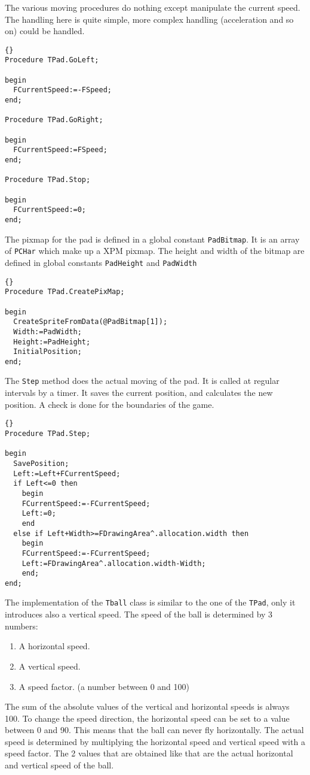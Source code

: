 \documentclass[10pt]{article}
\newcommand{\var}[1]{\texttt{#1}}
\begin{document}
The various moving procedures do nothing except manipulate the current speed.
The handling here is quite simple, more complex handling (acceleration and
so on) could be handled.
\begin{lstlisting}{}
Procedure TPad.GoLeft;

begin
  FCurrentSpeed:=-FSpeed;
end;

Procedure TPad.GoRight;

begin
  FCurrentSpeed:=FSpeed;
end;

Procedure TPad.Stop;

begin
  FCurrentSpeed:=0;
end;
\end{lstlisting}{}
The pixmap for the pad is defined in a global constant \var{PadBitmap}. It is 
an array of \var{PCHar} which make up a XPM pixmap. The height and width of 
the bitmap are defined in global constants \var{PadHeight} and \var{PadWidth}
\begin{lstlisting}{}
Procedure TPad.CreatePixMap; 

begin
  CreateSpriteFromData(@PadBitmap[1]);
  Width:=PadWidth;
  Height:=PadHeight;
  InitialPosition;
end;
\end{lstlisting}{}
The \var{Step} method does the actual moving of the pad. It is called at regular intervals
by a timer. It saves the current position, and calculates the new position. A check is 
done for the boundaries of the game.
\begin{lstlisting}{}
Procedure TPad.Step;

begin
  SavePosition;
  Left:=Left+FCurrentSpeed;
  if Left<=0 then
    begin
    FCurrentSpeed:=-FCurrentSpeed;
    Left:=0;
    end
  else if Left+Width>=FDrawingArea^.allocation.width then
    begin
    FCurrentSpeed:=-FCurrentSpeed;
    Left:=FDrawingArea^.allocation.width-Width;
    end;
end;
\end{lstlisting}{}

The implementation of the \var{Tball} class is similar to the one of the \var{TPad},
only it introduces also a vertical speed. The speed of the ball is determined by 3 
numbers:
\begin{enumerate}
\item A horizontal speed.
\item A vertical speed. 
\item A speed factor. (a number between 0 and 100)
\end{enumerate} 
The sum of the absolute values of the vertical and horizontal speeds is always 100. 
To change the speed direction, the horizontal speed can be set to a value between 0
and 90. This means that the ball can never fly horizontally. The actual speed is 
determined by multiplying the horizontal speed and vertical speed with a speed 
factor. The 2 values that are obtained like that are the actual horizontal and 
vertical speed of the ball.
\end{document}
